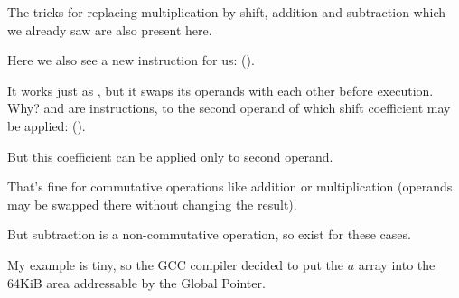The tricks for replacing multiplication by shift, addition and subtraction which we already saw
are also present here.

Here we also see a new instruction for us: \RSB ().

It works just as \SUB, but it swaps its operands with each other before execution.
Why?
\SUB and \RSB  are instructions, to the second operand of which shift coefficient may be applied: (). 

But this coefficient can be applied only to second operand.

That's fine for commutative operations like addition or multiplication 
(operands may be swapped there without changing the result).

But subtraction is a non-commutative operation, so \RSB exist for these cases.


My example is tiny, so the GCC compiler decided to put the $a$ array into the 64KiB area 
addressable by the Global Pointer.



